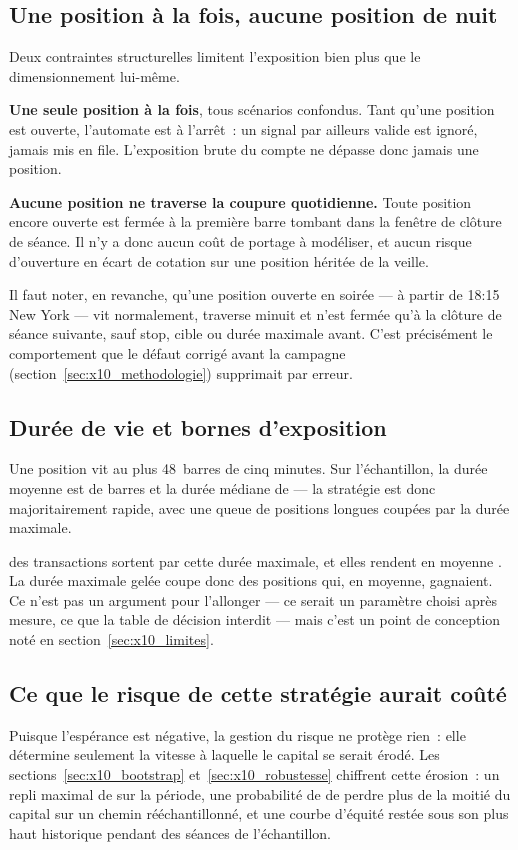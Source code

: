 \subsection{Une position à la fois, aucune position de nuit}

Deux contraintes structurelles limitent l'exposition bien plus que le
dimensionnement lui-même.

\textbf{Une seule position à la fois}, tous scénarios confondus. Tant qu'une
position est ouverte, l'automate est à l'arrêt~: un signal par ailleurs valide
est ignoré, jamais mis en file. L'exposition brute du compte ne dépasse donc
jamais une position.

\textbf{Aucune position ne traverse la coupure quotidienne.} Toute position
encore ouverte est fermée à la première barre tombant dans la fenêtre de
clôture de séance. Il n'y a donc aucun coût de portage à modéliser, et aucun
risque d'ouverture en écart de cotation sur une position héritée de la veille.

Il faut noter, en revanche, qu'une position ouverte en soirée --- à partir de
18:15 New York --- vit normalement, traverse minuit et n'est fermée qu'à la
clôture de séance suivante, sauf stop, cible ou durée maximale avant. C'est
précisément le comportement que le défaut corrigé avant la campagne
(section~\ref{sec:x10_methodologie}) supprimait par erreur.

\subsection{Durée de vie et bornes d'exposition}

Une position vit au plus 48~barres de cinq minutes. Sur l'échantillon, la
durée moyenne est de \XTenBarsHeldMean{} barres et la durée médiane de
\XTenBarsHeldMedian{} --- la stratégie est donc majoritairement rapide, avec
une queue de positions longues coupées par la durée maximale.

\XTenTimeShare{} des transactions sortent par cette durée maximale, et
elles rendent en moyenne . La durée maximale gelée
coupe donc des positions qui, en moyenne, gagnaient. Ce n'est pas un argument
pour l'allonger --- ce serait un paramètre choisi après mesure, ce que la
table de décision interdit --- mais c'est un point de conception noté en
section~\ref{sec:x10_limites}.

\subsection{Ce que le risque de cette stratégie aurait coûté}

Puisque l'espérance est négative, la gestion du risque ne protège rien~: elle
détermine seulement la vitesse à laquelle le capital se serait érodé. Les
sections~\ref{sec:x10_bootstrap} et~\ref{sec:x10_robustesse} chiffrent cette
érosion~: un repli maximal de \XTenMaxDDPct{} sur la période, une probabilité
de \XTenLossFiftyProb{} de perdre plus de la moitié du capital sur un chemin
rééchantillonné, et une courbe d'équité restée sous son plus haut historique
pendant \XTenRecoveryDays{} des \XTenSampleSessions{} séances de
l'échantillon.
